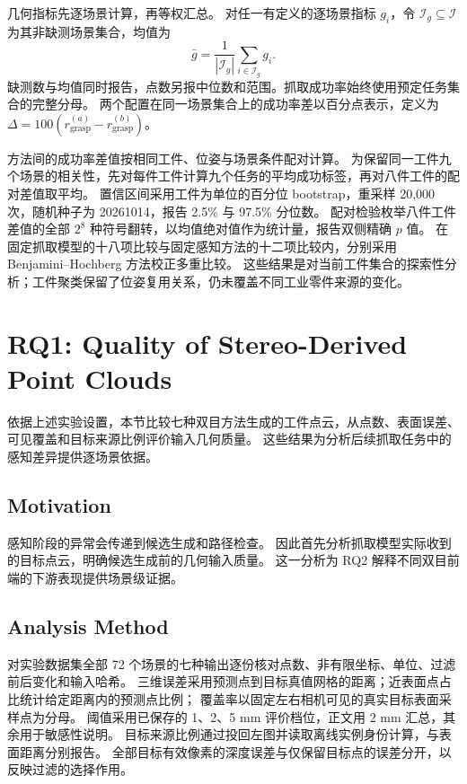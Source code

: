 \documentclass[UTF8,fontset=fandol,a4paper,11pt]{ctexart}
\newcommand{\qyb}[1]{#1}
\begin{document}
几何指标先逐场景计算，再等权汇总。
对任一有定义的逐场景指标 $g_i$，令 $\mathcal I_g\subseteq\mathcal I$ 为其非缺测场景集合，均值为
\[
 \bar g=\frac{1}{|\mathcal I_g|}\sum_{i\in\mathcal I_g}g_i.
\]
缺测数与均值同时报告，点数另报中位数和范围。抓取成功率始终使用预定任务集合的完整分母。
两个配置在同一场景集合上的成功率差以百分点表示，定义为 $\Delta=100(r_{\mathrm{grasp}}^{(a)}-r_{\mathrm{grasp}}^{(b)})$。


方法间的成功率差值按相同工件、位姿与场景条件配对计算。
为保留同一工件九个场景的相关性，先对每件工件计算九个任务的平均成功标签，再对八件工件的配对差值取平均。
置信区间采用工件为单位的百分位 bootstrap，重采样 20,000 次，随机种子为 20261014，报告 2.5\% 与 97.5\% 分位数。
配对检验枚举八件工件差值的全部 $2^8$ 种符号翻转，以均值绝对值作为统计量，报告双侧精确 $p$ 值。
在固定抓取模型的十八项比较与固定感知方法的十二项比较内，分别采用 Benjamini--Hochberg 方法校正多重比较。
这些结果是对当前工件集合的探索性分析；工件聚类保留了位姿复用关系，仍未覆盖不同工业零件来源的变化。

\section{\qyb{RQ1: Quality of Stereo-Derived Point Clouds}}
\label{sec:rq1}

依据上述实验设置，本节比较七种双目方法生成的工件点云，从点数、表面误差、可见覆盖和目标来源比例评价输入几何质量。
这些结果为分析后续抓取任务中的感知差异提供逐场景依据。

\subsection{\qyb{Motivation}}

感知阶段的异常会传递到候选生成和路径检查。
因此首先分析抓取模型实际收到的目标点云，明确候选生成前的几何输入质量。
这一分析为 RQ2 解释不同双目前端的下游表现提供场景级证据。

\subsection{\qyb{Analysis Method}}

对实验数据集全部 72 个场景的七种输出逐份核对点数、非有限坐标、单位、过滤前后变化和输入哈希。
三维误差采用预测点到目标真值网格的距离；近表面点占比统计给定距离内的预测点比例；
覆盖率以固定左右相机可见的真实目标表面采样点为分母。
阈值采用已保存的 1、2、5 mm 评价档位，正文用 2 mm 汇总，其余用于敏感性说明。
目标来源比例通过投回左图并读取离线实例身份计算，与表面距离分别报告。
全部目标有效像素的深度误差与仅保留目标点的误差分开，以反映过滤的选择作用。
\end{document}
